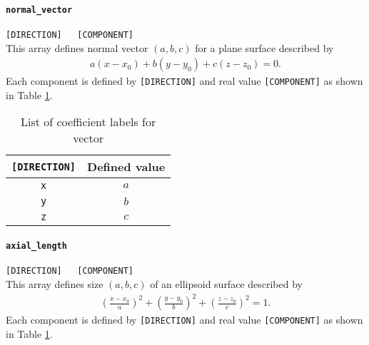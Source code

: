\paragraph{\tt normal\_vector}
\label{href_t:psf_normal_vector}
\verb|[DIRECTION]	[COMPONENT]| \\
This array defines normal vector $(a, b, c)$ for a plane surface described by 
\begin{eqnarray*}
a \left(x-x_{0} \right) + b \left(y-y_{0} \right) + c \left(z-z_{0} \right) = 0. 
\end{eqnarray*}
Each component is defined by \verb|[DIRECTION]| and real value \verb|[COMPONENT]| as shown in Table \ref{table:psf_normal}.
%
\begin{table}[htp]
\caption{List of coefficient labels for vector}
\begin{center}
\begin{tabular}{|c|c|}
\hline
\verb|[DIRECTION]| & Defined value \\ \hline
\verb|x| & $a$ \\
\verb|y| & $b$ \\
\verb|z| & $c$ \\ \hline
\end{tabular}
\end{center}
\label{table:psf_normal}
\end{table}
%

\paragraph{\tt axial\_length}
\label{href_t:psf_axial_length}
\verb|[DIRECTION]	[COMPONENT]| \\
This array defines size $(a, b, c)$ of an ellipsoid surface described by 
\begin{eqnarray*}
\left(\frac{x-x_{0}}{a} \right)^2 + \left( \frac{y-y_{0}}{b} \right)^2 + \left( \frac{z-z_{0}}{c} \right)^2 = 1. 
\end{eqnarray*}
Each component is defined by \verb|[DIRECTION]| and real value \verb|[COMPONENT]| as shown in Table \ref{table:psf_normal}.
%

